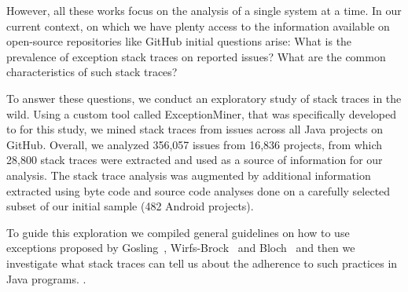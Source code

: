 \documentclass[conference]{IEEEtran}
\begin{document}
However, all these works focus on the analysis of a single system at a time. In our current context, on which we have plenty access to the information available on open-source repositories like GitHub initial questions arise: What is the prevalence of exception stack traces on reported issues? What are the common characteristics of such stack traces? 



To answer these questions, we conduct an exploratory study of stack traces in the wild. Using a custom tool called ExceptionMiner, that was specifically developed to for this study, we mined stack traces from issues across all Java projects on GitHub. Overall, we analyzed 356,057 issues from 16,836 projects, from which 28,800 stack traces were extracted and used as a source of information for our analysis. The stack trace analysis  was augmented by additional information extracted using byte code and source code analyses done on
a carefully selected subset of our initial sample (482 Android projects).

To guide this exploration we compiled general guidelines on how to use exceptions proposed by Gosling~\cite{gosling2000java}, Wirfs-Brock~\cite{wirfs2006toward} and Bloch~\cite{bloch2008effective} and then we investigate what stack traces can tell us about the adherence to such practices in Java programs.
.%


\end{document}
